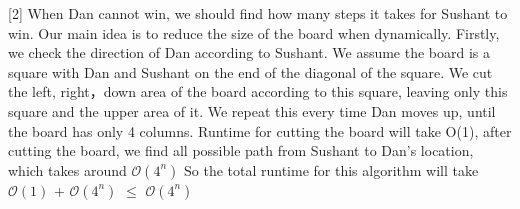 \documentclass{assignment-263}
\begin{document}
[2] When Dan cannot win, we should find how many steps it takes for Sushant to win. Our main idea is to reduce the size of the board when dynamically. Firstly, we check the direction of Dan according to Sushant. We assume the board is a square with Dan and Sushant on the end of the diagonal of the square. We cut the left, right，down area of the board according to this square, leaving only this square and the upper area of it. We repeat this every time Dan moves up, until the board has only 4 columns. Runtime for cutting the board will take O(1), after cutting the board, we find all possible path from Sushant to Dan’s location, which takes around $\mathcal{O}(4^n)$ \vskip5pt
So the total runtime for this algorithm will take $\mathcal{O}(1)$ + $\mathcal{O}(4^n)$ $\le$ $\mathcal{O}(4^n)$




\program
\end{document}
